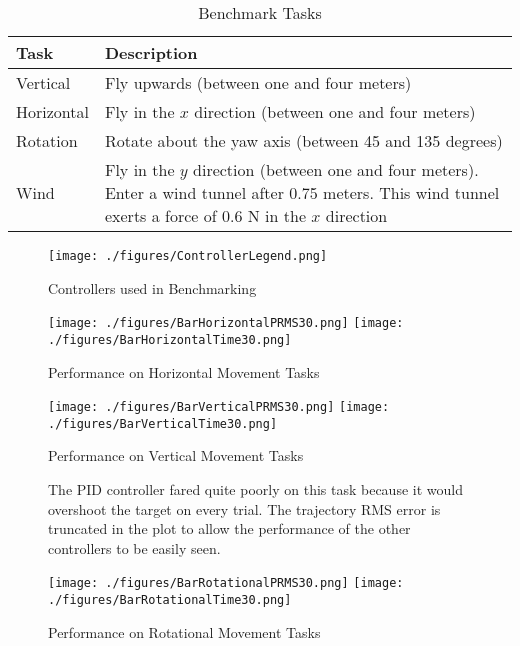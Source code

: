 \documentclass[letterpaper,12pt,titlepage,oneside,final]{book}
\begin{document}
\begin{table}
\caption{Benchmark Tasks} \label{table:tasks}
\begin{center}
\begin{tabular}{| l | p{9cm} |}

\hline
\textbf{Task} & \textbf{Description} \\ \hline
Vertical & Fly upwards (between one and four meters) \\ \hline
Horizontal & Fly in the $x$ direction (between one and four meters) \\ \hline
Rotation & Rotate about the yaw axis (between 45 and 135 degrees) \\ \hline
Wind & Fly in the $y$ direction (between one and four meters). Enter a wind tunnel after 0.75 meters. This wind tunnel exerts a force of 0.6 N in the $x$ direction \\ \hline

\end{tabular}
\end{center}
\end{table}

\begin{figure}
\centering
\texttt{[image: ./figures/ControllerLegend.png]}
\caption{Controllers used in Benchmarking}\label{fig:bar_legend}
\end{figure}

\begin{figure}
\centering
\texttt{[image: ./figures/BarHorizontalPRMS30.png]}
\texttt{[image: ./figures/BarHorizontalTime30.png]}
\caption{Performance on Horizontal Movement Tasks}\label{fig:bar_horizontal}
\captionsetup{singlelinecheck=off,font=footnotesize}
\caption*{}
\end{figure}

\begin{figure}
\centering
\texttt{[image: ./figures/BarVerticalPRMS30.png]}
\texttt{[image: ./figures/BarVerticalTime30.png]}
\caption{Performance on Vertical Movement Tasks}\label{fig:bar_vertical}
\captionsetup{singlelinecheck=off,font=footnotesize}
\caption*{
The PID controller fared quite poorly on this task because it would overshoot the target on every trial. The trajectory RMS error is truncated in the plot to allow the performance of the other controllers to be easily seen.
}
\end{figure}

\begin{figure}
\centering
\texttt{[image: ./figures/BarRotationalPRMS30.png]}
\texttt{[image: ./figures/BarRotationalTime30.png]}
\caption{Performance on Rotational Movement Tasks}\label{fig:bar_rotational}
\captionsetup{singlelinecheck=off,font=footnotesize}
\caption*{}
\end{figure}
\end{document}
